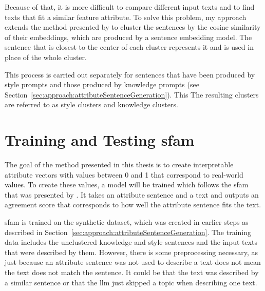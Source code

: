 Because of that, it is more difficult to compare different input texts and to find texts that fit a similar feature attribute.
To solve this problem, my approach extends the method presented by \citet{patelLearningInterpretableStyle2023} to cluster the sentences by the cosine similarity of their embeddings, which are produced by a sentence embedding model.
The sentence that is closest to the center of each cluster represents it and is used in place of the whole cluster.

This process is carried out separately for sentences that have been produced by style prompts and those produced by knowledge prompts (see Section~\ref{sec:approach:attributeSentenceGeneration}). This %
The resulting clusters are referred to as style clusters and knowledge clusters.


\section{Training and Testing \acs{sfam}}%
\label{sec:approach:sfam}

The goal of the method presented in this thesis is to create interpretable attribute vectors with values between \num{0} and \num{1} that correspond to real-world values. To create these values, a model will be trained which follows the \acf{sfam} that was presented by \citet{patelLearningInterpretableStyle2023}. It takes an attribute sentence and a text and outputs an agreement score that corresponds to how well the attribute sentence fits the text.

\ac{sfam} is trained on the synthetic dataset, which was created in earlier steps as described in Section~\ref{sec:approach:attributeSentenceGeneration}. The training data includes the unclustered knowledge and style sentences and the input texts that were described by them. However, there is some preprocessing necessary, as just because an attribute sentence was not used to describe a text does not mean the text does not match the sentence. It could be that the text was described by a similar sentence or that the \ac{llm} just skipped a topic when describing one text.

